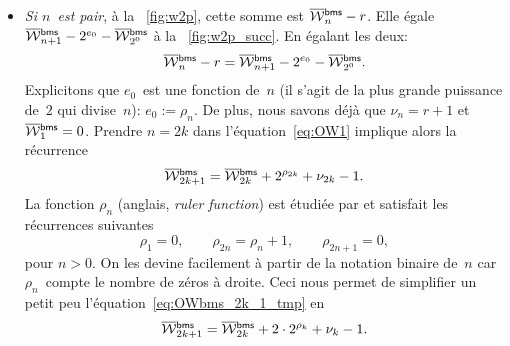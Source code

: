 \begin{itemize}

  \item \emph{Si \(n\)~est pair}, à la \fig~\vref{fig:w2p}, cette somme
  est \(\OW{\fun{bms}}{n} - r\). Elle
  égale \(\OW{\fun{bms}}{n+1} - 2^{e_0} - \OW{\fun{bms}}{2^0}\) à la
  \fig~\vref{fig:w2p_succ}. En égalant les deux:
  \begin{equation}
    \OW{\fun{bms}}{n} - r = \OW{\fun{bms}}{n+1} - 2^{e_0} -
    \OW{\fun{bms}}{2^0}.
      \label{eq:OW1}
  \end{equation}
  Explicitons que \(e_0\)~est une fonction de~\(n\) (il s'agit de la
  plus grande puissance de~\(2\) qui divise~\(n\)): \(e_0 :=
  \rho_n\). De plus, nous savons déjà que \(\nu_n = r+1\) et
  \(\OW{\fun{bms}}{1} = 0\). Prendre \(n=2k\) dans
  l'équation~\eqref{eq:OW1} implique alors la récurrence
    \begin{equation}
      \OW{\fun{bms}}{2k+1} = \OW{\fun{bms}}{2k} + 2^{\rho_{2k}} +
      \nu_{2k} - 1.
      \label{eq:OWbms_2k_1_tmp}
    \end{equation}
    La fonction \(\rho_n\) (anglais, \emph{ruler function}) est
    étudiée par \cite{GrahamKnuthPatashnik_1994,Knuth_2011}
     et satisfait les récurrences suivantes
    \begin{equation}
      \rho_{1} = 0,\qquad \rho_{2n} = \rho_{n} + 1,\qquad
      \rho_{2n+1} = 0,\label{eq:ruler}
    \end{equation}
    pour \(n>0\). On les devine facilement à partir de la notation
    binaire de~\(n\) car \(\rho_n\)~compte le nombre de zéros à
    droite. Ceci nous permet de simplifier un petit peu
    l'équation~\eqref{eq:OWbms_2k_1_tmp} en
    \begin{equation}
     \OW{\fun{bms}}{2k+1} = \OW{\fun{bms}}{2k} + 2 \cdot 2^{\rho_{k}}
     + \nu_{k} - 1.
     \label{eq:OWbms_2k_1}
    \end{equation}


\end{itemize}
